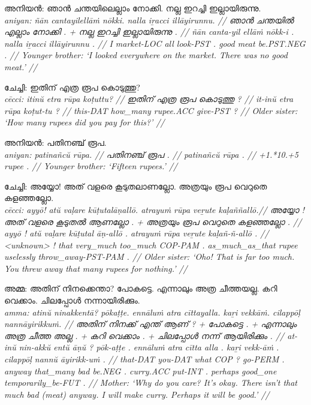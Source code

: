 \documentclass[a4paper]{article}
\begin{document}
\ex\begingl
\glpreamble അനിയൻ: ഞാൻ ചന്തയിലെല്ലാം നോക്കി. നല്ല ഇറച്ചി ഇല്ലായിരുന്നു. \\
\itshape aniyan: ñān cantayilellāṁ nōkki. nalla iṟacci illāyirunnu. //
\gla ഞാൻ ചന്തയിൽ എല്ലാം നോക്കി . + നല്ല ഇറച്ചി ഇല്ലായിരുന്നു . //
\glb ñān canta-yil ellāṁ nōkk-i . nalla iṟacci illāyirunnu . //
\glc I market-LOC all look-PST . good meat be.PST.NEG . //
\glft Younger brother: `I looked everywhere on the market. There was no good meat.' //
\endgl\xe

\ex\begingl
\glpreamble ചേച്ചി: ഇതിന് എത്ര രൂപ കൊടുത്തു? \\
\itshape cēcci: itinŭ etra rūpa koṭuttu? //
\gla ഇതിന് എത്ര രൂപ കൊടുത്തു ? //
\glb it-inŭ etra rūpa koṭut-tu ? //
\glc this-DAT how\_many rupee.ACC give-PST ? //
\glft Older sister: `How many rupees did you pay for this?' //
\endgl\xe

\ex\begingl
\glpreamble അനിയൻ: പതിനഞ്ച് രൂപ. \\
\itshape aniyan: patinañcŭ rūpa. //
\gla പതിനഞ്ച് രൂപ . //
\glb patinañcŭ rūpa . //
\glc +1.*10.+5 rupee . //
\glft Younger brother: `Fifteen rupees.' //
\endgl\xe

\ex\begingl
\glpreamble ചേച്ചി: അയ്യോ! അത് വളരെ കൂടുതലാണല്ലോ. അത്രയും രൂപ വെറുതെ ക\-ള\-ഞ്ഞ\-ല്ലോ. \\
\itshape cēcci: ayyō! atŭ vaḷare kūṭutalāṇallō. atrayuṁ rūpa veṟute kaḷaññallō.//
\gla അയ്യോ ! അത് വളരെ കൂടുതൽ ആണല്ലോ . +  അത്രയും രൂപ വെറുതെ കളഞ്ഞല്ലോ . //
\glb ayyō ! atŭ vaḷare kūṭutal āṇ-allō . atrayuṁ rūpa veṟute kaḷañ-ñ-allō . //
\glc \textless{}unknown\textgreater{} ! that very\_much too\_much COP-PAM . as\_much\_as\_that rupee uselessly throw\_away-PST-PAM . //
\glft Older sister: `Oho! That is far too much. You threw away that many rupees for nothing.' //
\endgl\xe

\ex\begingl
\glpreamble അമ്മ: അതിന് നിനക്കെന്താ? പോകട്ടെ. എന്നാലും അത്ര ചീത്തയല്ല. കറി വെക്കാം. ചിലപ്പോൾ നന്നായിരിക്കും. \\
\itshape amma: atinŭ ninakkentā? pōkaṭṭe. ennāluṁ atra cīttayalla. kaṟi vekkāṁ. cilappōḷ nannāyirikkuṁ. //
\gla അതിന് നിനക്ക് എന്ത് ആണ് ? + പോകട്ടെ . + എന്നാലും അത്ര ചീത്ത അല്ല . + കറി വെക്കാം . + ചിലപ്പോൾ നന്ന് ആയിരിക്കും . //
\glb at-inŭ nin-akkŭ entŭ āṇŭ ? pōk-aṭṭe . ennāluṁ atra cītta alla . kaṟi vekk-āṁ . cilappōḷ nannŭ āyirikk-uṁ . //
\glc that-DAT you-DAT what COP ? go-PERM . anyway that\_many bad be.NEG . curry.ACC put-INT . perhaps good\_one temporarily\_be-FUT . //
\glft Mother: `Why do you care? It's okay. There isn't that much bad (meat) anyway. I will make curry. Perhaps it will be good.' //
\endgl\xe
\end{document}
